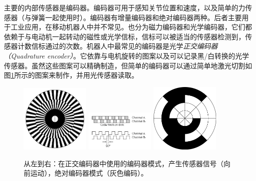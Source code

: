 
主要的内部传感器是编码器。编码器可用于感知关节位置和速度，以及简单的力传感器（与弹簧一起使用时）。编码器有增量编码器和绝对编码器两种。后者主要用于工业应用，在移动机器人中并不常见。也分为磁力编码器和光学编码器，它们都依赖于与电动机一起转动的磁性或光学信标，信标可以被适当的传感器检测到，传感器计数信标通过的次数。机器人中最常见的编码器是光学\emph{正交编码器（Quadrature encoder）}。它依靠与电机旋转的图案以及可以记录黑/白转换的光学传感器。虽然这些图案可以精确制造，但简单的编码器可以通过简单地激光切割如图\ref{fig:encoders}所示的图案来制作，并用光传感器读取。

\begin{figure}
	\centering
		\includegraphics[width=0.3\textwidth]{figs/encoderdisk.png}
		\includegraphics[width=0.3\textwidth]{figs/quadraturencoder.png}
		\includegraphics[width=0.3\textwidth]{figs/absoluteencoder.png}
	\caption{从左到右：在正交编码器中使用的编码器模式，产生传感器信号（向前运动），绝对编码器模式（灰色编码）。}
	\label{fig:encoders}
\end{figure}

